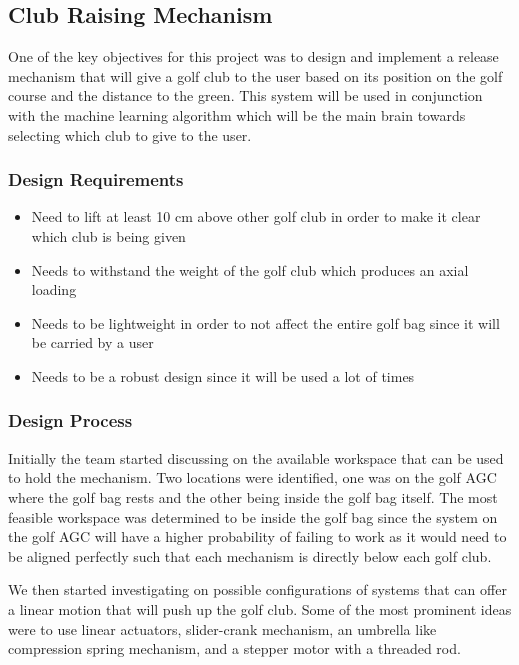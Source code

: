 \documentclass[11pt,landscape]{article}
\begin{document}
\newpage
\begin{multicols}{3}
\subsection{Club Raising Mechanism}
One of the key objectives for this project was to design and implement a release
mechanism that will give a golf club to the user based on its position on the
golf course and the distance to the green. This system will be used in
conjunction with the machine learning algorithm which will be the main brain
towards selecting which club to give to the user.

\subsubsection{Design Requirements}
\begin{itemize}
    \item Need to lift at least 10 cm above other golf club in order to make it
    clear which club is being given
    \item Needs to withstand the weight of the golf club which produces an axial loading
    \item Needs to be lightweight in order to not affect the entire golf bag
    since it will be carried by a user
    \item Needs to be a robust design since it will be used a lot of times
\end{itemize}

\subsubsection{Design Process}
Initially the team started discussing on the available workspace that can be
used to hold the mechanism. Two locations were identified, one was on the golf
AGC where the golf bag rests and the other being inside the golf bag itself.
The most feasible workspace was determined to be inside the golf bag since the
system on the golf AGC will have a higher probability of failing to work as it
would need to be aligned perfectly such that each mechanism is directly below
each golf club.

We then started investigating on possible configurations of systems that can
offer a linear motion that will push up the golf club. Some of the most
prominent ideas were to use linear actuators, slider-crank mechanism, an
umbrella like compression spring mechanism, and a stepper motor with a threaded
rod.


\end{multicols}
\end{document}
